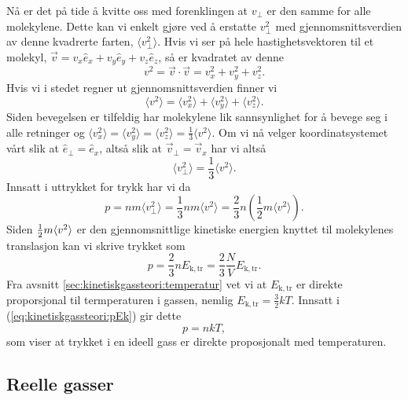 Nå er det på tide å kvitte oss med forenklingen at $v_\perp$ er den samme for alle molekylene. Dette kan vi enkelt gjøre ved å erstatte $v_\perp^2$ med gjennomsnittsverdien av denne kvadrerte farten, $\langle v_\perp^2\rangle$. Hvis vi ser på hele hastighetsvektoren til et molekyl, $\vec{v} = v_x \hat{e}_x +  v_y \hat{e}_y +  v_z \hat{e}_z$, så er kvadratet av denne
\begin{displaymath}
	v^2 = \vec{v}\cdot\vec{v} = v_x^2 + v_y^2+v_z^2.
\end{displaymath}
Hvis vi i stedet regner ut gjennomsnittsverdien finner vi
\begin{displaymath}
	\langle v^2\rangle =\langle v_x^2\rangle +\langle v_y^2\rangle + \langle v_z^2\rangle.
\end{displaymath}
Siden bevegelsen er tilfeldig har molekylene lik sannsynlighet for å bevege seg i alle retninger og $\langle v_x^2\rangle = \langle v_y^2\rangle = \langle v_z^2\rangle = \frac{1}{3}\langle v^2\rangle$. Om vi nå velger koordinatsystemet vårt slik at $\hat{e}_\perp = \hat{e}_x$, altså slik at $\vec{v}_\perp = \vec{v}_x$ har vi altså
\begin{displaymath}
	\langle v_\perp^2 \rangle =\frac{1}{3}\langle v^2 \rangle.
\end{displaymath}
Innsatt i uttrykket for trykk har vi da
\begin{displaymath}
	p = nm\langle v_\perp^2 \rangle = \frac{1}{3}nm\langle v^2 \rangle = \frac{2}{3}n\left(\frac{1}{2}m\langle v^2 \rangle\right).
\end{displaymath}
Siden $\frac{1}{2} m\langle v^2\rangle$ er den gjennomsnittlige kinetiske energien knyttet til molekylenes translasjon kan vi skrive trykket som
\begin{equation}
	\label{eq:kinetiskgassteori:pEk}
	p = \frac{2}{3}nE_\mathrm{k,tr} = \frac{2}{3}\frac{N}{V}E_\mathrm{k,tr}.
\end{equation}
Fra avsnitt \ref{sec:kinetiskgassteori:temperatur} vet vi at $E_\mathrm{k,tr}$ er direkte proporsjonal til termperaturen i gassen, nemlig $E_\mathrm{k,tr} = \frac{3}{2}kT$. Innsatt i (\ref{eq:kinetiskgassteori:pEk}) gir dette
\begin{displaymath}
	p = nkT,
\end{displaymath}
som viser at trykket i en ideell gass er direkte proposjonalt med temperaturen.

\subsection{Reelle gasser}
\label{sec:kinetiskgassteori:reellgass}
